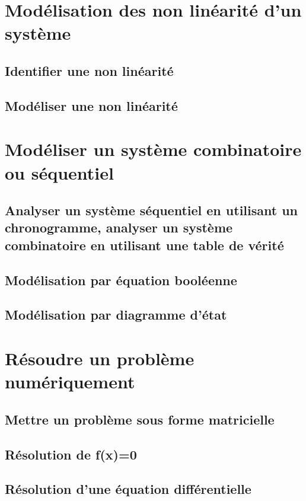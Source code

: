 \chapter{Modélisation des non linéarité d'un système} 
\section{Identifier une non linéarité} 
\clearpage 
\newpage 
\section{Modéliser une non linéarité} 
\clearpage 
\newpage 
\setchapterpreamble[u]{\margintoc} 
\chapter{Modéliser un système combinatoire ou séquentiel} 
\section{Analyser un système séquentiel en utilisant un chronogramme, analyser un système combinatoire en utilisant une table de vérité} 
\clearpage 
\newpage 
\section{Modélisation par équation booléenne} 
\clearpage 
\newpage 
\section{Modélisation par diagramme d'état} 
\graphicspath{{\repStyle/png/}{../SEQ/SEQ-03/50_BancBalafre/images/}} 
 
 
\clearpage 
\newpage 
\setchapterpreamble[u]{\margintoc} 
\chapter{Résoudre un problème numériquement} 
\section{Mettre un problème sous forme matricielle} 
\clearpage 
\newpage 
\section{Résolution de f(x)=0} 
\clearpage 
\newpage 
\section{Résolution d'une équation différentielle} 
\clearpage 
\newpage 
